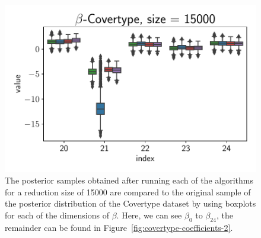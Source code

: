 \begin{figure}[ht!]
    \includegraphics[width=.49\linewidth]{figures/covertype_coefficients/covertype_coefficients_20.pdf}
    \caption{The posterior samples obtained after running each of
        the algorithms for a reduction size of 15000 are compared to
        the original sample of the posterior distribution of the
        Covertype dataset by using
        boxplots for each of the dimensions of $\beta$.
        Here, we can see $\beta_0$ to $\beta_{24}$, the remainder can
        be found in Figure~\ref{fig:covertype-coefficients-2}.}
    \label{fig:covertype-coefficients-1}
\end{figure}

